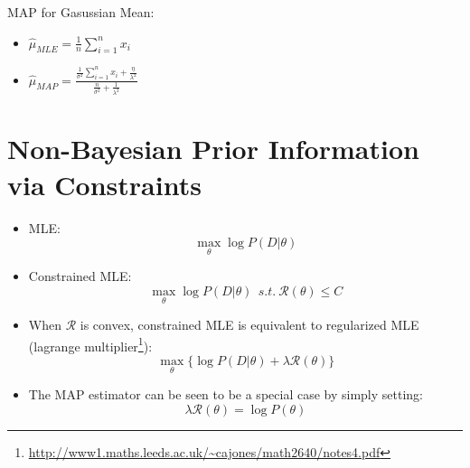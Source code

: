 \documentclass[letterpaper,10pt]{article}
\begin{document}
MAP for Gasussian Mean:
\begin{itemize}
	\item $\hat{\mu}_{MLE}=\frac{1}{n}\sum_{i=1}^{n}x_i$
	\item $\hat{\mu}_{MAP}=\frac{\frac{1}{\sigma^2}\sum_{i=1}^{n}x_i+\frac{\eta}{\lambda^2}}{\frac{n}{\sigma^2}+\frac{1}{\lambda^2}}$
\end{itemize}

\section{Non-Bayesian Prior Information via Constraints}

\begin{itemize}
	\item MLE: $$\max_\theta\log P(D|\theta)$$
	\item Constrained MLE: $$\max _\theta\log P(D|\theta)~~s.t.~\mathcal{R}(\theta)\leq C$$
	\item When $\mathcal{R}$ is convex, constrained MLE is equivalent to regularized MLE (lagrange multiplier\footnote{\url{http://www1.maths.leeds.ac.uk/~cajones/math2640/notes4.pdf}}): $$\max_\theta\{\log P(D|\theta)+\lambda\mathcal{R}(\theta)\}$$
	\item The MAP estimator can be seen to be a special case by simply setting: $$\lambda\mathcal{R}(\theta)=\log P(\theta)$$
\end{itemize}
\end{document}
